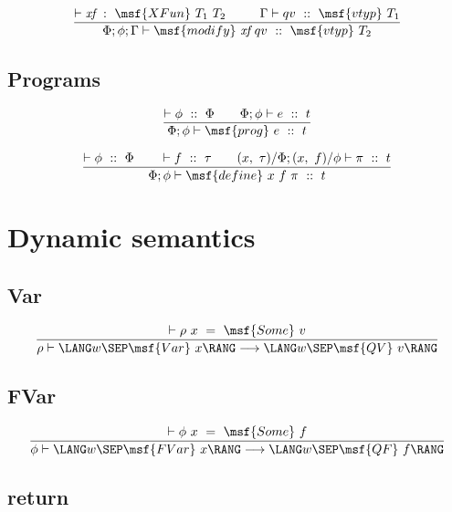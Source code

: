 \documentclass{article}
\begin{document}
\begin{gather}
  \frac{ \vdash \mbox{\it xf} \ : \ \msf{XFun} \ T_1 \ T_2 \ \qquad
    \ \Gamma \vdash qv \ :: \ \msf{vtyp} \ T_1 } {\Phi; \phi; \Gamma
    \vdash \msf{modify} \ \mbox{\it xf} \ qv \ :: \ \msf{vtyp} \ T_2}
\end{gather}


\subsection{Programs}

\begin{gather}
 \frac{\vdash \phi \ :: \ \Phi \qquad \Phi; \phi \vdash e \ :: \ t}
      {\Phi; \phi \vdash \msf{prog} \ e \ :: \ t }
\end{gather}


\begin{gather}
 \frac{\vdash \phi \ :: \ \Phi \qquad \vdash f \ :: \ \tau \qquad (x,
   \ \tau) / \Phi; (x, \ f)/\phi \vdash \pi \ :: \ t} {\Phi; \phi
   \vdash \msf{define} \ x \ f \ \pi \ :: \ t }
\end{gather}




\section{Dynamic semantics}

\subsection{Var}

\begin{gather}
  \frac{ \vdash \rho \ x \ = \ \msf{Some} \ v}{ \rho \vdash \LANG w
    \SEP \msf{Var} \ x \RANG \longrightarrow \LANG w \SEP \msf{QV} \ v
    \RANG }
\end{gather}



\subsection{FVar}


\begin{gather}
  \frac{ \vdash \phi \ x \ = \ \msf{Some} \ f}{ \phi \vdash \LANG w
    \SEP \msf{FVar} \ x \RANG \longrightarrow \LANG w \SEP \msf{QF}
    \ f \RANG }
\end{gather}


\subsection{return}
\end{document}
